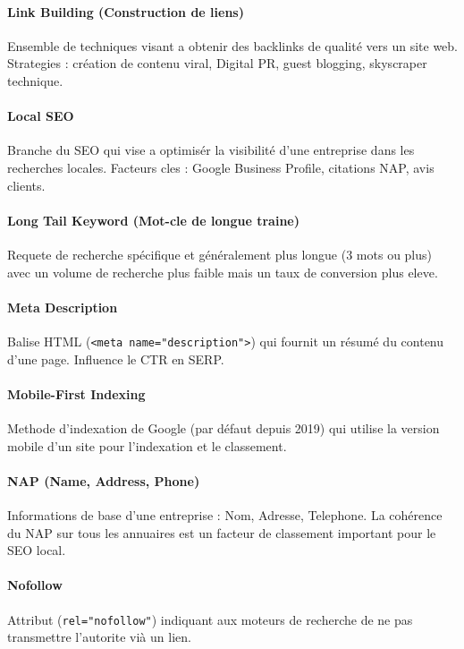 \paragraph*{Link Building (Construction de liens)}
Ensemble de techniques visant a obtenir des backlinks de qualité vers un site web. Strategies : création de contenu viral, Digital PR, guest blogging, skyscraper technique.

\paragraph*{Local SEO}
Branche du SEO qui vise a optimisér la visibilité d'une entreprise dans les recherches locales. Facteurs cles : Google Business Profile, citations NAP, avis clients.

\paragraph*{Long Tail Keyword (Mot-cle de longue traine)}
Requete de recherche spécifique et généralement plus longue (3 mots ou plus) avec un volume de recherche plus faible mais un taux de conversion plus eleve.

\paragraph*{Meta Description}
Balise HTML (\texttt{<meta name="description">}) qui fournit un résumé du contenu d'une page. Influence le CTR en SERP.

\paragraph*{Mobile-First Indexing}
Methode d'indexation de Google (par défaut depuis 2019) qui utilise la version mobile d'un site pour l'indexation et le classement.

\paragraph*{NAP (Name, Address, Phone)}
Informations de base d'une entreprise : Nom, Adresse, Telephone. La cohérence du NAP sur tous les annuaires est un facteur de classement important pour le SEO local.

\paragraph*{Nofollow}
Attribut (\texttt{rel="nofollow"}) indiquant aux moteurs de recherche de ne pas transmettre l'autorite vià un lien.

